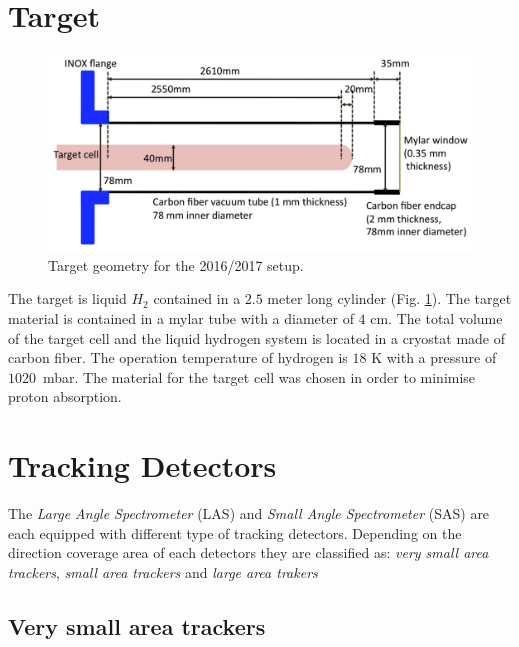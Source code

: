 
\section{Target}

\begin{figure}[!h]
  \centering
	\includegraphics[scale=0.3]{./gfx/Target.png}
	\caption{Target geometry for the 2016/2017 setup.}
	\label{pic:Target}
\end{figure}

The target is liquid $H_2$ contained in a $2.5$ meter long cylinder (Fig. \ref{pic:Target}). The target material is contained in a mylar tube with a diameter of $4$ cm. The total volume of the target cell and the liquid hydrogen system is located in a cryostat made of carbon fiber. The operation temperature of hydrogen is $18$ K with a pressure of $1020$~mbar. The material for the target cell was chosen in order to minimise proton absorption.


\section{Tracking Detectors}\label{sec:track}

The \textit{Large Angle Spectrometer} (LAS) and \textit{Small Angle Spectrometer} (SAS) are each equipped with different type of tracking detectors. Depending on the direction coverage area of each detectors they are classified as:
\textit{very small area trackers}, \textit{small area trackers} and \textit{large area trakers}

\subsection{Very small area trackers}

